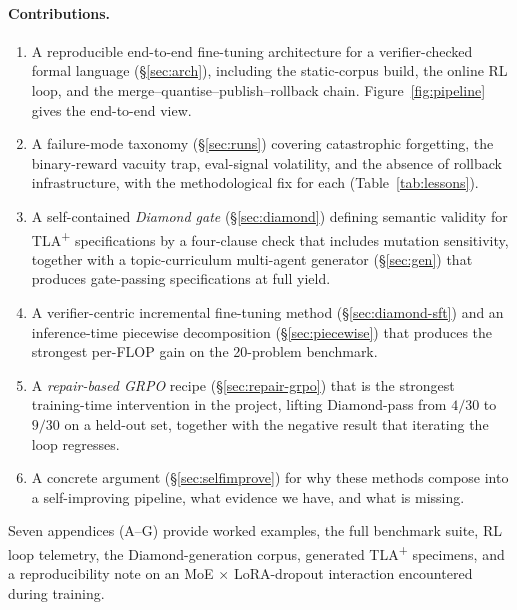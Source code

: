 \documentclass[11pt]{article}
\begin{document}
\paragraph{Contributions.}
\begin{enumerate}[leftmargin=1.4em,itemsep=2pt]
\item A reproducible end-to-end fine-tuning architecture for a
  verifier-checked formal language (\S\ref{sec:arch}), including the
  static-corpus build, the online RL loop, and the
  merge--quantise--publish--rollback chain.
  Figure~\ref{fig:pipeline} gives the end-to-end view.
\item A failure-mode taxonomy
  (\S\ref{sec:runs}) covering catastrophic forgetting, the
  binary-reward vacuity trap, eval-signal volatility, and the absence of
  rollback infrastructure, with the methodological fix for each
  (Table~\ref{tab:lessons}).
\item A self-contained \emph{Diamond gate} (\S\ref{sec:diamond})
  defining semantic validity for TLA\textsuperscript{+} specifications
  by a four-clause check that includes mutation sensitivity, together
  with a topic-curriculum multi-agent generator (\S\ref{sec:gen}) that
  produces gate-passing specifications at full yield.
\item A verifier-centric incremental fine-tuning method
  (\S\ref{sec:diamond-sft}) and an inference-time piecewise
  decomposition (\S\ref{sec:piecewise}) that produces the strongest
  per-FLOP gain on the 20-problem benchmark.
\item A \emph{repair-based GRPO} recipe (\S\ref{sec:repair-grpo}) that
  is the strongest training-time intervention in the project, lifting
  Diamond-pass from $4/30$ to $9/30$ on a held-out set, together with
  the negative result that iterating the loop regresses.
\item A concrete argument (\S\ref{sec:selfimprove}) for why these
  methods compose into a self-improving pipeline, what evidence we have,
  and what is missing.
\end{enumerate}

\noindent Seven appendices (A--G) provide worked examples, the full
benchmark suite, RL loop telemetry, the Diamond-generation corpus,
generated TLA\textsuperscript{+} specimens, and a reproducibility
note on an MoE $\times$ LoRA-dropout interaction encountered during
training.
\end{document}
